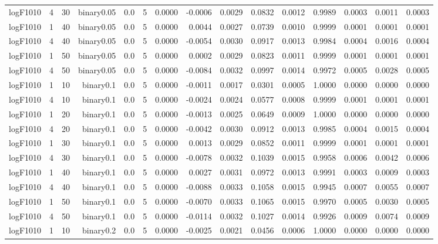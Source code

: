 \begin{longtable}{rrrrrrrrrrrrrrr}
  logF1010 & 4 & 30 & binary0.05 & 0.0 & 5 & 0.0000 & -0.0006 & 0.0029 & 0.0832 & 0.0012 & 0.9989 & 0.0003 & 0.0011 & 0.0003 \\ 
  logF1010 & 1 & 40 & binary0.05 & 0.0 & 5 & 0.0000 & 0.0044 & 0.0027 & 0.0739 & 0.0010 & 0.9999 & 0.0001 & 0.0001 & 0.0001 \\ 
  logF1010 & 4 & 40 & binary0.05 & 0.0 & 5 & 0.0000 & -0.0054 & 0.0030 & 0.0917 & 0.0013 & 0.9984 & 0.0004 & 0.0016 & 0.0004 \\ 
  logF1010 & 1 & 50 & binary0.05 & 0.0 & 5 & 0.0000 & 0.0002 & 0.0029 & 0.0823 & 0.0011 & 0.9999 & 0.0001 & 0.0001 & 0.0001 \\ 
  logF1010 & 4 & 50 & binary0.05 & 0.0 & 5 & 0.0000 & -0.0084 & 0.0032 & 0.0997 & 0.0014 & 0.9972 & 0.0005 & 0.0028 & 0.0005 \\ 
  logF1010 & 1 & 10 & binary0.1 & 0.0 & 5 & 0.0000 & -0.0011 & 0.0017 & 0.0301 & 0.0005 & 1.0000 & 0.0000 & 0.0000 & 0.0000 \\ 
  logF1010 & 4 & 10 & binary0.1 & 0.0 & 5 & 0.0000 & -0.0024 & 0.0024 & 0.0577 & 0.0008 & 0.9999 & 0.0001 & 0.0001 & 0.0001 \\ 
  logF1010 & 1 & 20 & binary0.1 & 0.0 & 5 & 0.0000 & -0.0013 & 0.0025 & 0.0649 & 0.0009 & 1.0000 & 0.0000 & 0.0000 & 0.0000 \\ 
  logF1010 & 4 & 20 & binary0.1 & 0.0 & 5 & 0.0000 & -0.0042 & 0.0030 & 0.0912 & 0.0013 & 0.9985 & 0.0004 & 0.0015 & 0.0004 \\ 
  logF1010 & 1 & 30 & binary0.1 & 0.0 & 5 & 0.0000 & 0.0013 & 0.0029 & 0.0852 & 0.0011 & 0.9999 & 0.0001 & 0.0001 & 0.0001 \\ 
  logF1010 & 4 & 30 & binary0.1 & 0.0 & 5 & 0.0000 & -0.0078 & 0.0032 & 0.1039 & 0.0015 & 0.9958 & 0.0006 & 0.0042 & 0.0006 \\ 
  logF1010 & 1 & 40 & binary0.1 & 0.0 & 5 & 0.0000 & 0.0027 & 0.0031 & 0.0972 & 0.0013 & 0.9991 & 0.0003 & 0.0009 & 0.0003 \\ 
  logF1010 & 4 & 40 & binary0.1 & 0.0 & 5 & 0.0000 & -0.0088 & 0.0033 & 0.1058 & 0.0015 & 0.9945 & 0.0007 & 0.0055 & 0.0007 \\ 
  logF1010 & 1 & 50 & binary0.1 & 0.0 & 5 & 0.0000 & -0.0070 & 0.0033 & 0.1065 & 0.0015 & 0.9970 & 0.0005 & 0.0030 & 0.0005 \\ 
  logF1010 & 4 & 50 & binary0.1 & 0.0 & 5 & 0.0000 & -0.0114 & 0.0032 & 0.1027 & 0.0014 & 0.9926 & 0.0009 & 0.0074 & 0.0009 \\ 
  logF1010 & 1 & 10 & binary0.2 & 0.0 & 5 & 0.0000 & -0.0025 & 0.0021 & 0.0456 & 0.0006 & 1.0000 & 0.0000 & 0.0000 & 0.0000 \\ 

\end{longtable}
